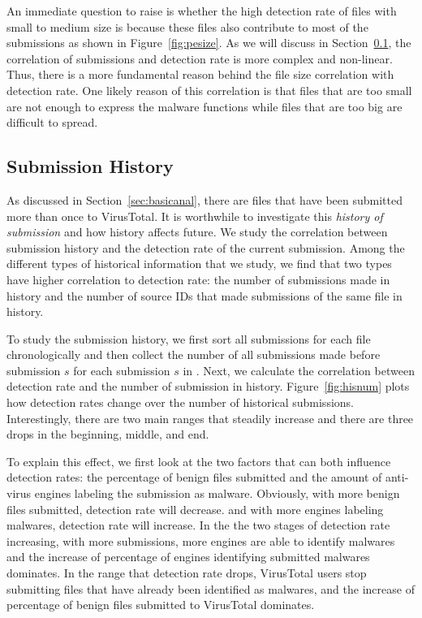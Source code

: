 An immediate question to raise is whether the high detection rate of files with small to medium size
is because these files also contribute to most of the submissions as shown in Figure~\ref{fig:pesize}.
As we will discuss in Section~\ref{sec:history}, the correlation of submissions and detection rate is more complex and non-linear.
Thus, there is a more fundamental reason behind the file size correlation with detection rate.
One likely reason of this correlation is that files that are too small are not enough to express the
malware functions while files that are too big are difficult to spread.

\subsection{Submission History}
\label{sec:history}

%



As discussed in Section~\ref{sec:basicanal}, there are files that have been submitted more than once to VirusTotal. 
It is worthwhile to investigate this {\em history of submission} and how history affects future.
We study the correlation between submission history and the detection rate of the current submission.
Among the different types of historical information that we study,
we find that two types have higher correlation to detection rate:
the number of submissions made in history and the number of source IDs that made submissions of the same file in history.

To study the submission history, we first sort all submissions for each file chronologically
and then collect the number of all submissions made before submission $s$ for each submission $s$ in \vt.
Next, we calculate the correlation between detection rate and the number of submission in history.
Figure~\ref{fig:hisnum} plots how detection rates change over the number of historical submissions.
Interestingly, there are two main ranges that steadily increase and there are three drops in the beginning, middle, and end.

To explain this effect, we first look at the two factors that can both influence detection rates:
the percentage of benign files submitted and the amount of anti-virus engines labeling the submission as malware.
Obviously, with more benign files submitted, detection rate will decrease.   
and with more engines labeling malwares, detection rate will increase. 
In the the two stages of detection rate increasing, 
with more submissions, more engines are able to identify malwares 
and the increase of percentage of engines identifying submitted malwares dominates. 
In the range that detection rate drops, 
VirusTotal users stop submitting files that have already been identified as malwares,
and the increase of percentage of benign files submitted to VirusTotal dominates. 

